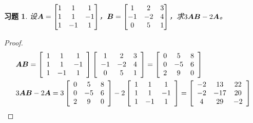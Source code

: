 \documentclass{ctexart}
\newtheorem{problem}{习题}[section]
\begin{document}
\begin{problem}
设\(\boldsymbol{A}=\begin{bmatrix}
    1 & 1  & 1  \\
    1 & 1  & -1 \\
    1 & -1 & 1
\end{bmatrix}\)，\(\boldsymbol{B}=\begin{bmatrix}
    1  & 2  & 3 \\
    -1 & -2 & 4 \\
    0  & 5  & 1
\end{bmatrix}\)，求\(3\boldsymbol{A}\boldsymbol{B}-2\boldsymbol{A}\)。
\end{problem}
\begin{proof}
    \begin{align*}
         & \boldsymbol{A}\boldsymbol{B}           =
        \left[\begin{array}{ccc}
                1 & 1  & 1  \\
                1 & 1  & -1 \\
                1 & -1 & 1
            \end{array}\right]
        \left[\begin{array}{ccc}
                1  & 2  & 3 \\
                -1 & -2 & 4 \\
                0  & 5  & 1
            \end{array}\right]=
        \left[\begin{array}{ccc}
                0 & 5  & 8 \\
                0 & -5 & 6 \\
                2 & 9  & 0
            \end{array}\right] \\
         & 3\boldsymbol{A}\boldsymbol{B}-2 \boldsymbol{A}  =
        3\left[\begin{array}{ccc}
                0 & 5  & 8 \\
                0 & -5 & 6 \\
                2 & 9  & 0
            \end{array}\right]
        -2\left[\begin{array}{ccc}
                1 & 1  & 1  \\
                1 & 1  & -1 \\
                1 & -1 & 1
            \end{array}\right]
        =\left[\begin{array}{ccc}
                -2 & 13  & 22 \\
                -2 & -17 & 20 \\
                4  & 29  & -2
            \end{array}\right]
    \end{align*}
\end{proof}
\end{document}
